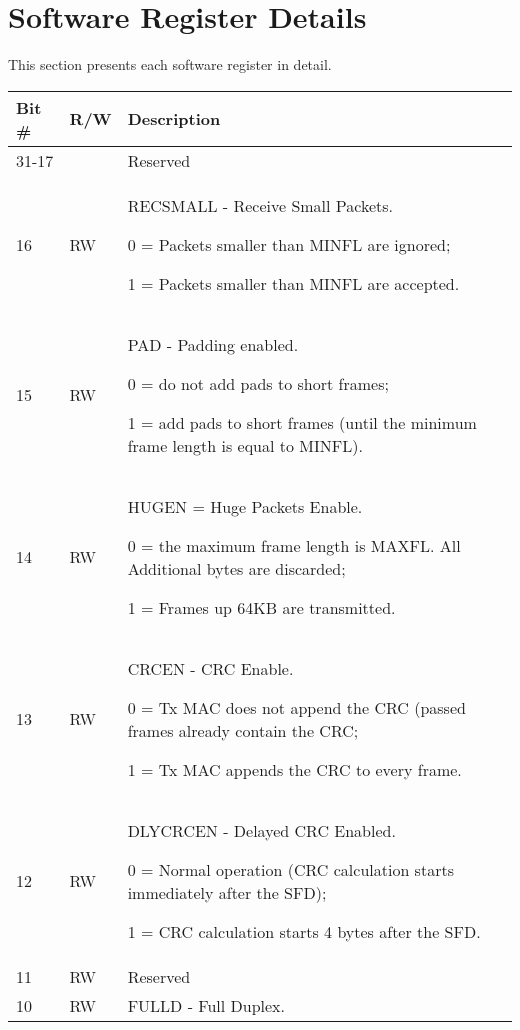 \section{Software Register Details}
\label{sec:swreg_details}

This section presents each software register in detail.

\begin{table}[H]
  \centering
  \begin{tabularx}{\textwidth}{|l|l|X|}
    
    \hline
    \rowcolor{iob-green}
    {\bf Bit \#} & {\bf R/W} & {\bf Description} \\ \hline

    31-17   &   & Reserved \\ \hline
    \rowcolor{iob-blue}
    16      & RW & RECSMALL - Receive Small Packets. 

                0 = Packets smaller than MINFL are ignored; 

                1 = Packets smaller than MINFL are accepted. \\ \hline
    15      & RW &   PAD - Padding enabled. 

                0 = do not add pads to short frames; 

                1 = add pads to short frames (until the minimum frame length is equal to MINFL). \\ \hline
    \rowcolor{iob-blue}
    14      & RW &   HUGEN = Huge Packets Enable. 

                0 = the maximum frame length is MAXFL. All Additional bytes are discarded; 

                1 = Frames up 64KB are transmitted. \\ \hline
    13      & RW &   CRCEN - CRC Enable. 

                0 = Tx MAC does not append the CRC (passed frames already contain the CRC; 

                1 = Tx MAC appends the CRC to every frame. \\ \hline
    \rowcolor{iob-blue}
    12      & RW &   DLYCRCEN - Delayed CRC Enabled. 

                0 = Normal operation (CRC calculation starts immediately after the SFD); 

                1 = CRC calculation starts 4 bytes after the SFD. \\ \hline
    11      & RW &  Reserved \\ \hline
    \rowcolor{iob-blue}
    10      & RW &  FULLD - Full Duplex. 


\end{tabularx}
\end{table}
